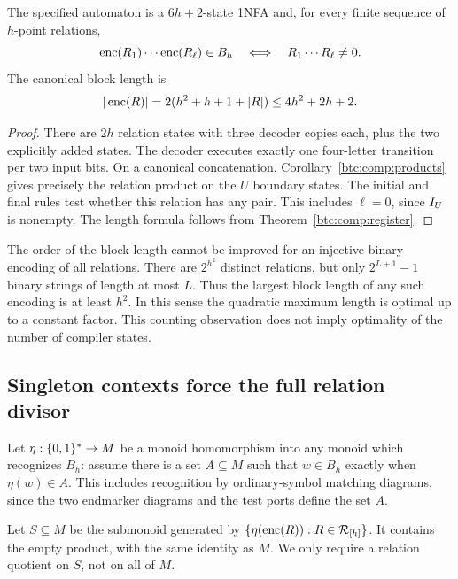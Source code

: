\begin{proposition}\label{btc:comp:binary-count}
The specified automaton is a $6h+2$-state 1NFA and, for every
finite sequence of $h$-point relations,
\begin{equation}\label{btc:comp:canonical-membership}
 \operatorname{enc}(R_1)\cdots\operatorname{enc}(R_\ell)\in B_h
 \quad\Longleftrightarrow\quad R_1\cdots R_\ell\ne0.
\end{equation}
The canonical block length is
\[
 |\operatorname{enc}(R)|=2(h^2+h+1+|R|)\le4h^2+2h+2.
\]
\end{proposition}

\begin{proof}
There are $2h$ relation states with three decoder copies each,
plus the two explicitly added states. The decoder executes exactly
one four-letter transition per two input bits. On a canonical
concatenation, Corollary~\ref{btc:comp:products} gives precisely the
relation product on the $U$ boundary states. The initial and final
rules test whether this relation has any pair. This includes
$\ell=0$, since $I_U$ is nonempty. The length formula follows
from Theorem~\ref{btc:comp:register}.
\end{proof}

The order of the block length cannot be improved for an injective
binary encoding of all relations. There are $2^{h^2}$ distinct
relations, but only $2^{L+1}-1$ binary strings of length at most $L$.
Thus the largest block length of any such encoding is at least
$h^2$. In this sense the quadratic maximum length is optimal up
to a constant factor. This counting observation does not imply
optimality of the number of compiler states.

\subsection{Singleton contexts force the full relation divisor}
\label{btc:comp:quotient-section}

Let $\eta:\{0,1\}^*\to M$ be a monoid homomorphism into any monoid
which recognizes $B_h$: assume there is a set $A\subseteq M$ such
that $w\in B_h$ exactly when $\eta(w)\in A$. This includes
recognition by ordinary-symbol matching diagrams, since the two
endmarker diagrams and the test ports define the set $A$.

Let $S\subseteq M$ be the submonoid generated by
$\{\eta(\operatorname{enc}(R)):R\in\mathcal{R}_{[h]}\}$. It contains the empty product,
with the same identity as $M$. We only require a relation quotient
on $S$, not on all of $M$.

